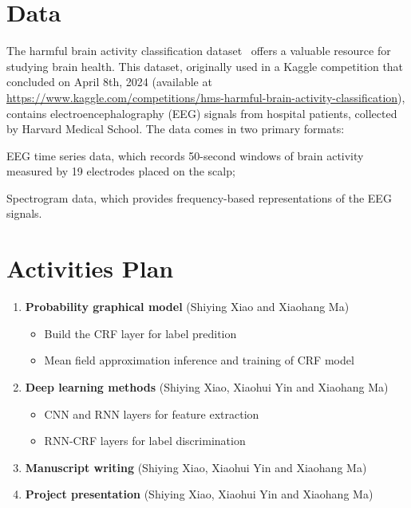 \documentclass[12pt]{article}
\begin{document}
\section{Data}


The harmful brain activity classification dataset~\citep{jing2023development}
offers a valuable resource for studying brain health. This dataset,
originally used in a Kaggle competition that concluded on April 8th, 2024
(available at
\url{https://www.kaggle.com/competitions/hms-harmful-brain-activity-classification}),
contains electroencephalography (EEG) signals from hospital patients, collected
by Harvard Medical School. The data comes in two primary formats:
\begin{enumerate*}[label = (\roman*)]
\item EEG time series data, which records 50-second windows of brain activity
measured by 19 electrodes placed on the scalp;
\item Spectrogram data, which provides frequency-based representations of the
EEG signals.
\end{enumerate*}


\section{Activities Plan}


\begin{enumerate}
\item \textbf{Probability graphical model}
(Shiying Xiao and Xiaohang Ma)
\begin{itemize}
\item Build the CRF layer for label predition
\item Mean field approximation inference and training of CRF model
\end{itemize}
\item \textbf{Deep learning methods} (Shiying Xiao, Xiaohui Yin and Xiaohang Ma)
\begin{itemize}
\item CNN and RNN layers for feature extraction
\item RNN-CRF layers for label discrimination
\end{itemize}
\item \textbf{Manuscript writing} (Shiying Xiao, Xiaohui Yin and Xiaohang Ma)
\item \textbf{Project presentation} (Shiying Xiao, Xiaohui Yin and Xiaohang Ma)
\end{enumerate}




\end{document}
